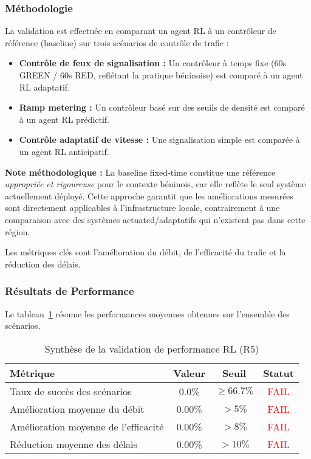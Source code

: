 \subsubsection{Méthodologie}
La validation est effectuée en comparant un agent RL à un contrôleur de référence (baseline) sur trois scénarios de contrôle de trafic :
\begin{itemize}
    \item \textbf{Contrôle de feux de signalisation :} Un contrôleur à temps fixe (60s GREEN / 60s RED, reflétant la pratique béninoise) est comparé à un agent RL adaptatif.
    \item \textbf{Ramp metering :} Un contrôleur basé sur des seuils de densité est comparé à un agent RL prédictif.
    \item \textbf{Contrôle adaptatif de vitesse :} Une signalisation simple est comparée à un agent RL anticipatif.
\end{itemize}

\textbf{Note méthodologique :} La baseline fixed-time constitue une référence \textit{appropriée et rigoureuse} pour le contexte béninois, car elle reflète le seul système actuellement déployé. Cette approche garantit que les améliorations mesurées sont directement applicables à l'infrastructure locale, contrairement à une comparaison avec des systèmes actuated/adaptatifs qui n'existent pas dans cette région.

Les métriques clés sont l'amélioration du débit, de l'efficacité du trafic et la réduction des délais.

\subsubsection{Résultats de Performance}

Le tableau~\ref{tab:rl_performance_summary_76} résume les performances moyennes obtenues sur l'ensemble des scénarios.

\begin{table}[h!]
\centering
\caption{Synthèse de la validation de performance RL (R5)}
\label{tab:rl_performance_summary_76}
\begin{tabular}{|l|c|c|c|}
\hline
\textbf{Métrique} & \textbf{Valeur} & \textbf{Seuil} & \textbf{Statut} \\
\hline
Taux de succès des scénarios & 0.0\% & $\geq 66.7\%$ & \textcolor{red}{FAIL} \\
Amélioration moyenne du débit & 0.00\% & $> 5\%$ & \textcolor{red}{FAIL} \\
Amélioration moyenne de l'efficacité & 0.00\% & $> 8\%$ & \textcolor{red}{FAIL} \\
Réduction moyenne des délais & 0.00\% & $> 10\%$ & \textcolor{red}{FAIL} \\
\hline
\end{tabular}
\end{table}

